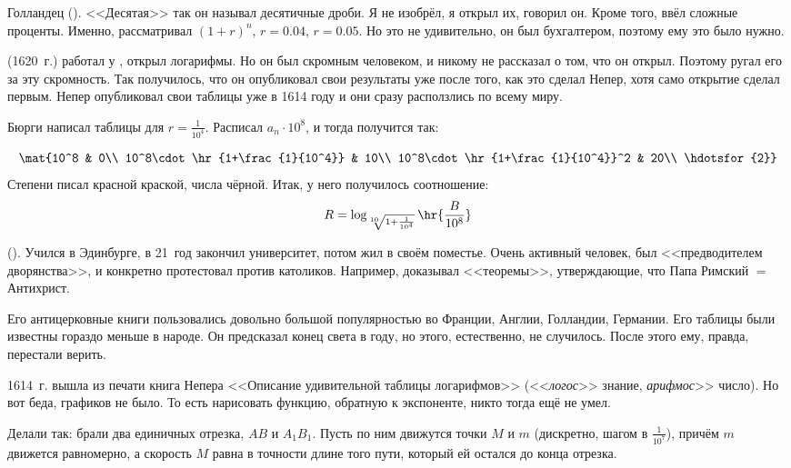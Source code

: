 \documentclass[a4paper,oneside,fleqn,10pt]{article}
\begin{document}
Голландец 
(). <<Десятая>> так он называл десятичные дроби. Я не
изобрёл, я открыл их, говорил он. Кроме того, ввёл сложные
проценты. Именно, рассматривал $(1+r)^n$, $r = 0.04$, $r = 0.05$.  Но
это не удивительно, он был бухгалтером, поэтому ему это было нужно.

 (1620~г.) работал у , открыл
логарифмы. Но он был скромным человеком, и никому не рассказал о том,
что он открыл. Поэтому  ругал его за эту скромность.  Так
получилось, что он опубликовал свои результаты уже после того, как это
сделал Непер, хотя само открытие сделал первым.  Непер опубликовал
свои таблицы уже в 1614 году и они сразу расползлись по всему миру.

Бюрги написал таблицы для $r = \frac{1}{10^4}$. Расписал $a_n\cdot
10^8$, и тогда получится так:

$$\mat{10^8 & 0\\ 10^8\cdot\hr{1+\frac{1}{10^4}} &
  10\\ 10^8\cdot\hr{1+\frac{1}{10^4}}^2 & 20\\ \hdotsfor{2}}$$ Степени
писал красной краской, числа чёрной.  Итак, у него получилось
соотношение:
$$R = \log_{\sqrt[10]{1+\frac{1}{10^4}}} \hr{\frac{B}{10^8}}$$

 ().  Учился в Эдинбурге, в 21~год закончил
университет, потом жил в своём поместье.  Очень активный человек, был
<<предводителем дворянства>>, и конкретно протестовал против
католиков. Например, доказывал <<теоремы>>, утверждающие, что Папа
Римский $=$ Антихрист.

Его антицерковные книги пользовались довольно большой популярностью во
Франции, Англии, Голландии, Германии.  Его таблицы были известны
гораздо меньше в народе.  Он предсказал конец света в 
году, но этого, естественно, не случилось.  После этого ему, правда,
перестали верить.

1614~г. вышла из печати книга Непера <<Описание удивительной таблицы
логарифмов>> (<<\emph{логос}>> знание, \emph{арифмос}>> число).  Но
вот беда, графиков не было. То есть нарисовать функцию, обратную к
экспоненте, никто тогда ещё не умел.

Делали так: брали два единичных отрезка, $AB$ и $A_1B_1$.  Пусть по
ним движутся точки $M$ и $m$ (дискретно, шагом в $\frac{1}{10^7}$),
причём $m$ движется равномерно, а скорость $M$ равна в точности длине
того пути, который ей остался до конца отрезка.
\end{document}
